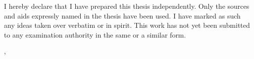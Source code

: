 

I hereby declare that I have prepared this thesis independently.
Only the sources and aids expressly named in the thesis have been used.
I have marked as such any ideas taken over verbatim or in spirit.
This work has not yet been submitted to any examination authority in the same or a similar form.
\vspace{20mm}

\location, \submissiondate
\vspace{10mm}

\underline{\hspace{8cm}}\\\documentauthor